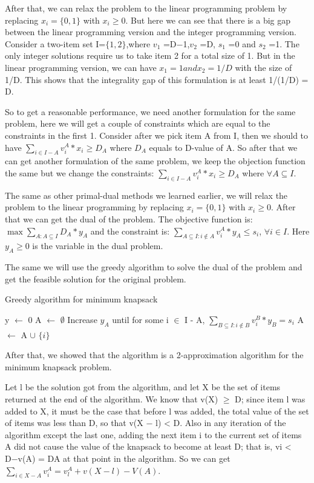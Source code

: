 \documentclass[usletter]{article}
\begin{document}
After that, we can relax the problem to the linear programming problem by replacing  $x_i = \{0,1\}$ with $x_i \ge 0$. But here we can see that there is a big gap between the linear programming version and the integer programming version.  Consider a two-item set I=$\{1,2\}$,where $v_1$ =D−1,$v_2$ =D, $s_1$ =0 and $s_2$ =1. The only integer solutions require us to take item 2 for a total size of 1. But in the linear programming version, we can have $x_1 = 1 and x_2 = 1/D$ with the size of 1/D. This shows that the integrality gap of this formulation is at least 1/(1/D) = D.

So to get a reasonable performance, we need another formulation for the same problem, here we will get a couple of constraints which are equal to the constraints in the first 1. Consider after we pick item A from I, then we should to have $\sum_{i \in I-A}{v_i^A * x_i} \ge D_A$ where $D_A$ equals to D-value of A. So after that we can get another formulation of the same problem, we keep the objection function the same but we change the constraints: $\sum_{i \in I-A}{v_i^A * x_i} \ge D_A$ where $\forall{A} \subseteq I$.

The same as other primal-dual methods we learned earlier, we will relax the problem to the linear programming by replacing $x_i = \{0, 1\}$ with $x_i \ge 0$. After that we can get the dual of the problem. The objective function is: $\max{\sum_{A: A \subseteq I}D_A * y_A}$ and the constraint is: $\sum_{A \subseteq{I}: i \notin A} v_i^A*y_A \le s_i$, $\forall{i} \in I$. Here $y_A \ge 0$ is the variable in the dual problem.

The same we will use the greedy algorithm to solve the dual of the problem and get the feasible solution for the original problem. 


\begin{algorithm}
\caption{Greedy algorithm for minimum knapsack}
\begin{algorithmic}[1]
\State y $\leftarrow$ 0
\State A $\leftarrow$  $\emptyset$
	\State Increase $y_A$ until for some i $\in$ I - A, $\sum_{B \subseteq I: i \notin B}{v_i^B*y_B} = s_i$
	\State A $\leftarrow$ A $\cup$ $\{i\}$
\EndWhile
\end{algorithmic}
\end{algorithm}

After that, we showed that the algorithm is a 2-approximation algorithm for the minimum knapsack problem.

Let l be the solution got  from the algorithm, and let X be the set of items returned at the end of the algorithm. We know that v(X) $\ge$ D; since item l was added to X, it must be the case that before l was added, the total value of the set of items was less than D, so that v(X − l) < D. Also in any iteration of the algorithm except the last one, adding the next item i to the current set of items A did not cause the value of the knapsack to become at least D; that is, vi < D−v(A) = DA at that point in the algorithm. So we can get $\sum_{i \in X-A}{v_i^A} = v_l^A + v(X-l) -V(A)$. 
\end{document}
